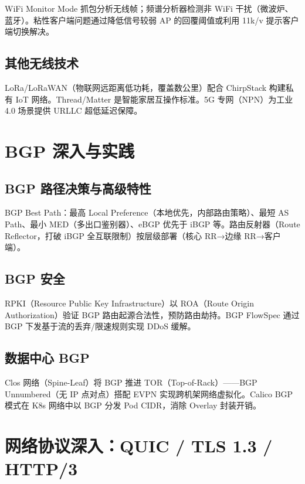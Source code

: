 \documentclass[12pt,UTF8]{ctexbook}
\begin{document}
WiFi Monitor Mode 抓包分析无线帧；频谱分析器检测非 WiFi 干扰（微波炉、蓝牙）。粘性客户端问题通过降低信号较弱 AP 的回覆阈值或利用 11k/v 提示客户端切换解决。

  \section{其他无线技术}

LoRa/LoRaWAN（物联网远距离低功耗，覆盖数公里）配合 ChirpStack 构建私有 IoT 网络。Thread/Matter 是智能家居互操作标准。5G 专网（NPN）为工业 4.0 场景提供 URLLC 超低延迟保障。


\chapter{BGP 深入与实践}
\label{chap:bgp-deep}

  \section{BGP 路径决策与高级特性}

BGP Best Path：最高 Local Preference（本地优先，内部路由策略）、最短 AS Path、最小 MED（多出口鉴别器）、eBGP 优先于 iBGP 等。路由反射器（Route Reflector，打破 iBGP 全互联限制）按层级部署（核心 RR→边缘 RR→客户端）。

  \section{BGP 安全}

RPKI（Resource Public Key Infrastructure）以 ROA（Route Origin Authorization）验证 BGP 路由起源合法性，预防路由劫持。BGP FlowSpec 通过 BGP 下发基于流的丢弃/限速规则实现 DDoS 缓解。

  \section{数据中心 BGP}

Clos 网络（Spine-Leaf）将 BGP 推进 TOR（Top-of-Rack）——BGP Unnumbered（无 IP 点对点）搭配 EVPN 实现跨机架网络虚拟化。Calico BGP 模式在 K8s 网络中以 BGP 分发 Pod CIDR，消除 Overlay 封装开销。


\chapter{网络协议深入：QUIC / TLS 1.3 / HTTP/3}
\label{chap:protocol-deep}
\end{document}
